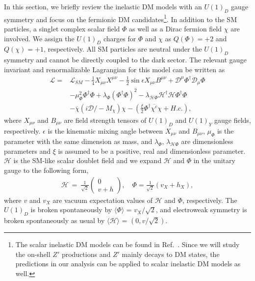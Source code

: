 \documentclass[preprint, superscriptaddress,amsmath, nofootinbib]{revtex4-1}
\begin{document}
{ 
In this section, we briefly review the inelastic DM models with an $U(1)_D$ gauge symmetry and focus on the fermionic DM candidates\footnote{The scalar inelastic DM models can be found in Ref.~\cite{Baek:2014kna, Izaguirre:2015zva, Okada:2019sbb, Kang:2021oes, Li:2021rzt, Bertuzzo:2022ozu}. Since we will study the on-shell $Z'$ productions and $Z'$ mainly decays to DM states, the predictions in our analysis can be applied to scalar inelastic DM models as well.}. In addition to the SM particles, a singlet complex scalar field $\Phi$ as well as a Dirac fermion field $\chi$ are involved. We assign the $U(1)_D$ charges for $\Phi$ and $\chi$ as $Q(\Phi) = +2$ and $Q(\chi) = +1$, respectively. All SM particles are neutral under the $U(1)_D$ symmetry and cannot be directly coupled to the dark sector. The relevant gauge invariant and renormalizable Lagrangian for this model can be written as 
\begin{equation}
\begin{split}
    \mathcal{L} =& \mathcal{L}_{SM}  -\frac{1}{4}X_{\mu\nu}X^{\mu\nu}-\frac{1}{2}\sin{\epsilon}X_{\mu\nu}B^{\mu\nu}+\mathcal{D}^\mu{\Phi^\dag}\mathcal{D}_\mu{\Phi} \\
    &- \mu^2_{\Phi}\Phi^\dag{\Phi}+\lambda_{\Phi}(\Phi^\dag{\Phi})^2-\lambda_{\mathcal{H}\Phi}\mathcal{H}^\dag\mathcal{H}\Phi^\dag{\Phi} \\
    &- \overline{\chi}(i\mathcal{D} \!\!\!/ - M_\chi)\chi - (\frac{\xi}{2}\Phi^{\dag}\overline{\chi^c}\chi + H.c.),
    \label{Lf}
\end{split}
\end{equation}
where $X_{\mu\nu}$ and $B_{\mu\nu}$ are field strength tensors of $U(1)_D$ and $U(1)_Y$ gauge fields, respectively. $\epsilon$ is the kinematic mixing angle between $X_{\mu\nu}$ and $B_{\mu\nu}$, $\mu_{\Phi}$ is the parameter with the same dimension as mass, and $\lambda_{\Phi}$, $\lambda_{\mathcal{H}\Phi}$ are dimensionless parameters and $\xi$ is assumed to be a positive, real and dimensionless parameter. $\mathcal{H}$ is the SM-like scalar doublet field and we expand $\mathcal{H}$ and $\Phi$ in the unitary gauge to the following form, 
\begin{align}
    {\mathcal{H}}\ = \ \frac{1}{\sqrt{2}} \begin{pmatrix}
    {0} \\
    v+h
    \end{pmatrix},\quad  \Phi=\frac{1}{\sqrt{2}}(v_X+h_X), 
\end{align}
where $v$ and $v_X$ are vacuum expectation values of $\mathcal{H}$ and $\Phi$, respectively.
The $U(1)_D$ is broken spontaneously by $\langle \Phi \rangle$ = ${v_{X}}/{\sqrt{2}}$, and electroweak symmetry is broken spontaneously as usual by $\langle \mathcal{H} \rangle$ = $(0,{v}/{\sqrt{2}})$.

}
\end{document}
